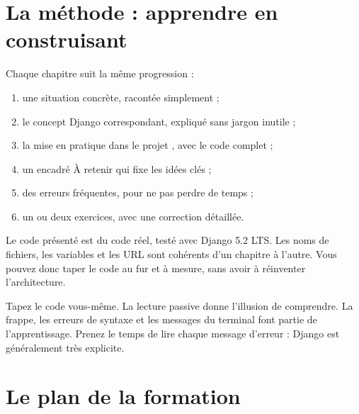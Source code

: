 \section*{La méthode : apprendre en construisant}

Chaque chapitre suit la même progression :
\begin{enumerate}
  \item une situation concrète, racontée simplement ;
  \item le concept Django correspondant, expliqué sans jargon inutile ;
  \item la mise en pratique dans le projet \gesibiblio, avec le code complet ;
  \item un encadré \og À retenir \fg{} qui fixe les idées clés ;
  \item des erreurs fréquentes, pour ne pas perdre de temps ;
  \item un ou deux exercices, avec une correction détaillée.
\end{enumerate}

Le code présenté est du code réel, testé avec Django 5.2 LTS. Les noms de fichiers,
les variables et les URL sont cohérents d'un chapitre à l'autre. Vous pouvez donc
taper le code au fur et à mesure, sans avoir à réinventer l'architecture.

\begin{bonne}
Tapez le code vous-même. La lecture passive donne l'illusion de comprendre. La
frappe, les erreurs de syntaxe et les messages du terminal font partie de
l'apprentissage. Prenez le temps de lire chaque message d'erreur : Django est
généralement très explicite.
\end{bonne}

\section*{Le plan de la formation}

